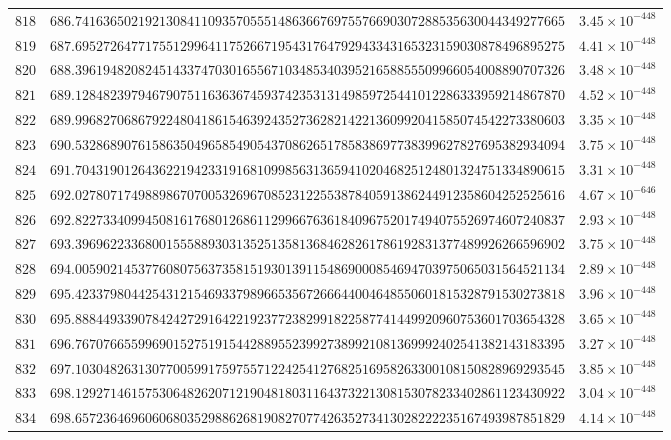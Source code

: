 \documentclass[12pt,reqno]{amsart}
\theoremstyle{remark}
\begin{document}
\begin{longtable}{clc}
$818$ & $686.7416365021921308411093570555148636676975576690307288535630044349277665$ & $3.45\times 10^{-448}$ \\
$819$ & $687.6952726477175512996411752667195431764792943343165323159030878496895275$ & $4.41\times 10^{-448}$ \\
$820$ & $688.3961948208245143374703016556710348534039521658855509966054008890707326$ & $3.48\times 10^{-448}$ \\
$821$ & $689.1284823979467907511636367459374235313149859725441012286333959214867870$ & $4.52\times 10^{-448}$ \\
$822$ & $689.9968270686792248041861546392435273628214221360992041585074542273380603$ & $3.35\times 10^{-448}$ \\
$823$ & $690.5328689076158635049658549054370862651785838697738399627827695382934094$ & $3.75\times 10^{-448}$ \\
$824$ & $691.7043190126436221942331916810998563136594102046825124801324751334890615$ & $3.31\times 10^{-448}$ \\
$825$ & $692.0278071749889867070053269670852312255387840591386244912358604252525616$ & $4.67\times 10^{-646}$ \\
$826$ & $692.8227334099450816176801268611299667636184096752017494075526974607240837$ & $2.93\times 10^{-448}$ \\
$827$ & $693.3969622336800155588930313525135813684628261786192831377489926266596902$ & $3.75\times 10^{-448}$ \\
$828$ & $694.0059021453776080756373581519301391154869000854694703975065031564521134$ & $2.89\times 10^{-448}$ \\
$829$ & $695.4233798044254312154693379896653567266644004648550601815328791530273818$ & $3.96\times 10^{-448}$ \\
$830$ & $695.8884493390784242729164221923772382991822587741449920960753601703654328$ & $3.65\times 10^{-448}$ \\
$831$ & $696.7670766559969015275191544288955239927389921081369992402541382143183395$ & $3.27\times 10^{-448}$ \\
$832$ & $697.1030482631307700599175975571224254127682516958263300108150828969293545$ & $3.85\times 10^{-448}$ \\
$833$ & $698.1292714615753064826207121904818031164373221308153078233402861123430922$ & $3.04\times 10^{-448}$ \\
$834$ & $698.6572364696060680352988626819082707742635273413028222235167493987851829$ & $4.14\times 10^{-448}$ \\

\end{longtable}
\end{document}
